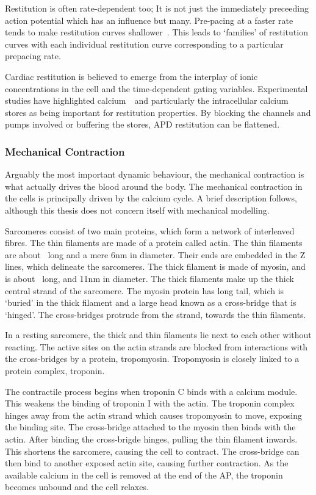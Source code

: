 Restitution is often rate-dependent too; It is not just the immediately
preceeding action potential which has an influence but many.
Pre-pacing at a faster rate tends to make restitution curves
shallower~\cite{Boyett1978}.
This leads to `families' of restitution curves with each individual restitution
curve corresponding to a particular prepacing rate.

Cardiac restitution is believed to emerge from the interplay of ionic
concentrations in the cell and the time-dependent gating variables.
Experimental studies have highlighted calcium~\cite{Goldhaber2005}\ and
particularly the intracellular calcium stores as being important for restitution
properties.
By blocking the channels and pumps involved or buffering the stores, APD
restitution can be flattened.

\subsubsection{Mechanical Contraction}

Arguably the most important dynamic behaviour, the mechanical contraction is
what actually drives the blood around the body.
The mechanical contraction in the cells is principally driven by the calcium
cycle.
A brief description follows, although this thesis does not concern itself with
mechanical modelling.

Sarcomeres consist of two main proteins, which form a network of interleaved fibres.
The thin filaments are made of a protein called actin.
The thin filaments are about \ long and a mere \unit{6}{nm} in diameter.
Their ends are embedded in the Z lines, which delineate the sarcomeres.
The thick filament is made of myosin, and is about \ long, and
\unit{11}{nm} in diameter.
The thick filaments make up the thick central strand of the sarcomere.
The myosin protein has long tail, which is `buried' in the thick filament and a large head known as a cross-bridge that is `hinged'.
The cross-bridges protrude from the strand, towards the thin filaments.

In a resting sarcomere, the thick and thin filaments lie next to each other without reacting.
The active sites on the actin strands are blocked from interactions with the
cross-bridges by a protein, tropomyosin.
Tropomyosin is closely linked to a protein complex, troponin.

The contractile process begins when troponin C binds with a calcium module.
This weakens the binding of troponin I with the actin.
The troponin complex hinges away from the actin strand which causes tropomyosin
to move, exposing the binding site.
The cross-bridge attached to the myosin then binds with the actin.
After binding the cross-brigde hinges, pulling the thin filament inwards.
This shortens the sarcomere, causing the cell to contract.
The cross-bridge can then bind to another exposed actin site, causing further
contraction.
As the available calcium in the cell is removed at the end of the AP, the
troponin becomes unbound and the cell relaxes.

